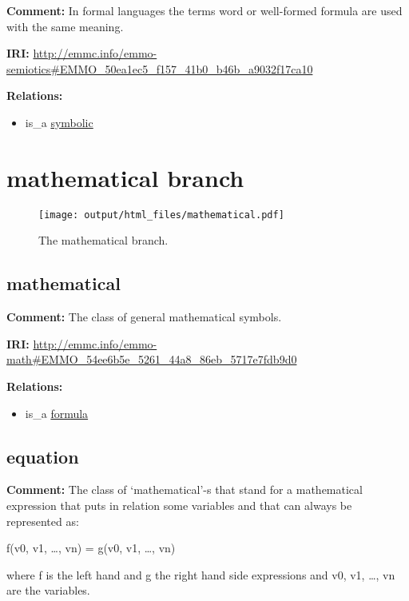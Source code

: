 \documentclass[a4paper,]{report}
\providecommand{\tightlist}{%
  \setlength{\itemsep}{0pt}\setlength{\parskip}{0pt}}
\begin{document}
\textbf{Comment:} In formal languages the terms word or well-formed
formula are used with the same meaning.

\textbf{IRI:}
\url{http://emmc.info/emmo-semiotics\#EMMO_50ea1ec5_f157_41b0_b46b_a9032f17ca10}

\textbf{Relations:}

\begin{itemize}
\tightlist
\item
  is\_a \protect\hyperlink{symbolic}{symbolic}
\end{itemize}

\hypertarget{mathematical-branch}{%
\section{mathematical branch}\label{mathematical-branch}}

\begin{figure}
\centering
\texttt{[image: output/html\_files/mathematical.pdf]}
\caption{The mathematical branch.}
\end{figure}

\hypertarget{mathematical}{%
\subsection{mathematical}\label{mathematical}}

\textbf{Comment:} The class of general mathematical symbols.

\textbf{IRI:}
\url{http://emmc.info/emmo-math\#EMMO_54ee6b5e_5261_44a8_86eb_5717e7fdb9d0}

\textbf{Relations:}

\begin{itemize}
\tightlist
\item
  is\_a \protect\hyperlink{formula}{formula}
\end{itemize}

\hypertarget{equation}{%
\subsection{equation}\label{equation}}

\textbf{Comment:} The class of `mathematical'-s that stand for a
mathematical expression that puts in relation some variables and that
can always be represented as:

f(v0, v1, \ldots{}, vn) = g(v0, v1, \ldots{}, vn)

where f is the left hand and g the right hand side expressions and v0,
v1, \ldots{}, vn are the variables.
\end{document}
